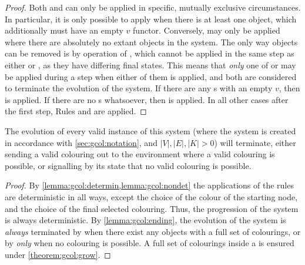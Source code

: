 \begin{proof}
Both  and  can only be applied in specific, mutually exclusive circumstances.  In particular, it is only possible to apply  when there is at least one \bo{} object, which additionally must have an empty \(v\) \gls{functor}.  Conversely,  may only be applied where there are absolutely no extant \bo{} objects in the system.  The only way \bo{} objects can be removed is by operation of , which cannot be applied in the same step as either  or , as they have differing final states.  This means that \emph{only} one of  or  may be applied during a step when either of them is applied, and both are considered to terminate the evolution of the system.  If there are any \bo{}s with an empty \(v\), then  is applied.  If there are no \bo{}s whatsoever, then  is applied.  In all other cases after the first step, Rules  and  are applied.
\end{proof}

\begin{theorem}
The evolution of every valid instance of this system (where the system is created in accordance with \cref{sec:gcol:notation}, and \(|V|, |E|, |K| > 0\)) will terminate, either sending a valid colouring out to the environment where a valid colouring is possible, or signalling by its state that no valid colouring is possible.
\end{theorem}

\begin{proof}
By \cref{lemma:gcol:determin,lemma:gcol:nondet} the applications of the rules are deterministic in all ways, except the choice of the colour of the starting node, and the choice of the final selected colouring.  Thus, the progression of the system is always deterministic.  By \cref{lemma:gcol:ending}, the evolution of the system is \emph{always} terminated by  when there exist any \bo{} objects with a full set of colourings, or by  \emph{only} when no colouring is possible.  A full set of colourings inside a \bo{} is ensured under \cref{theorem:gcol:grow}.
\end{proof}

